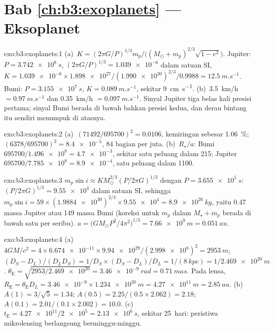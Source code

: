 \section*{Bab \ref{ch:b3:exoplanets} --- Eksoplanet}

\begin{solution}{exo:b3:exoplanets:1}
(a)~$K = (2\pi G/P)^{1/3}m_p/\bigl((M_\odot + m_p)^{2/3}\sqrt{1 - e^2}\bigr)$.
Jupiter: $P = \qty{3.742e8}{s}$, $(2\pi G/P)^{1/3} = \num{1.039e-6}$ dalam
satuan SI, $K = \num{1.039e-6}\times\num{1.898e27}/(\num{1.990e30})^{2/3}/0.9988
= \qty{12.5}{m.s^{-1}}$. Bumi: $P = \qty{3.155e7}{s}$, $K =
\qty{0.089}{m.s^{-1}}$, sekitar \qty{9}{cm.s^{-1}}. (b)~\qty{3.5}{km/h} $=
\qty{0.97}{m.s^{-1}}$ dan \qty{0.35}{km/h} $= \qty{0.097}{m.s^{-1}}$.
Sinyal Jupiter tiga belas kali presisi pertama; sinyal Bumi
berada di bawah bahkan presisi kedua, dan derau bintang itu sendiri menumpuk di atasnya.
\end{solution}

\begin{solution}{exo:b3:exoplanets:2}
(a)~$(71492/695700)^2 = \num{0.0106}$, kemiringan sebesar \qty{1.06}{\percent};
$(6378/695700)^2 = \num{8.4e-5}$, 84 bagian per juta. (b)~$R_\star/a$:
Bumi $695700/\num{1.496e8} = \num{4.7e-3}$, sekitar satu peluang dalam 215;
Jupiter $695700/\num{7.785e8} = \num{8.9e-4}$, satu peluang dalam 1100.
\end{solution}

\begin{solution}{exo:b3:exoplanets:3}
$m_p\sin i \approx K M_\odot^{2/3}(P/2\pi G)^{1/3}$ dengan $P =
\qty{3.655e5}{s}$: $(P/2\pi G)^{1/3} = \num{9.55e4}$ dalam satuan SI, sehingga $m_p
\sin i = 59\times(\num{1.9884e30})^{2/3}\times\num{9.55e4} =
\qty{8.9e26}{kg}$, yaitu 0.47 massa Jupiter atau 149 massa Bumi (koreksi
untuk $m_p$ dalam $M_\star + m_p$ berada di bawah satu per seribu).
$a = \bigl(GM_\odot P^2/4\pi^2\bigr)^{1/3} = \qty{7.66e9}{m} =
\qty{0.051}{au}$.
\end{solution}

\begin{solution}{exo:b3:exoplanets:4}
(a)~$4GM/c^2 = 4\times\num{6.674e-11}\times\num{9.94e29}/(\num{2.998e8})^2 =
\qty{2953}{m}$; $(D_S - D_L)/(D_LD_S) = 1/D_S\times(D_S - D_L)/D_L =
1/(\qty{8}{kpc}) = 1/\qty{2.469e20}{m}$. $\theta_\mathrm E =
\sqrt{2953/\num{2.469e20}} = \qty{3.46e-9}{rad} = \qty{0.71}{mas}$. Pada
lensa, $R_\mathrm E = \theta_\mathrm E D_L = \num{3.46e-9}\times
\qty{1.234e20}{m} = \qty{4.27e11}{m} = \qty{2.85}{au}$. (b)~$A(1) =
3/\sqrt5 = 1.34$; $A(0.5) = 2.25/(0.5\times2.062) = 2.18$; $A(0.1) =
2.01/(0.1\times2.002) = 10.0$. (c)~$t_\mathrm E = \num{4.27e11}/\num{2e5}
= \qty{2.13e6}{s}$, sekitar \num{25}~hari: peristiwa mikrolensing berlangsung berminggu-minggu.
\end{solution}

